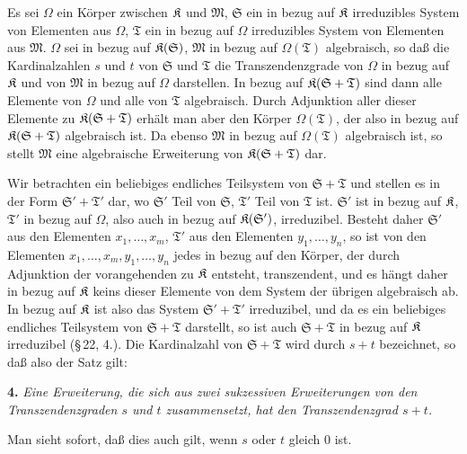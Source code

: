 Es sei \(\Omega\) ein Körper zwischen \(\mathfrak K\) und \(\mathfrak M\), \(\mathfrak S\) ein in bezug auf \(\mathfrak K\) irreduzibles System von Elementen aus \(\Omega\), \(\mathfrak T\) ein in bezug auf \(\Omega\) irreduzibles System von Elementen aus \(\mathfrak M\). \(\Omega\) sei in bezug auf \(\mathfrak K(\mathfrak S)\), \(\mathfrak M\) in bezug auf \(\Omega(\mathfrak T)\) algebraisch, so daß die Kardinalzahlen \(s\) und \(t\) von \(\mathfrak S\) und \(\mathfrak T\) die Transzendenzgrade von \(\Omega\) in bezug auf \(\mathfrak K\) und von \(\mathfrak M\) in bezug auf \(\Omega\) darstellen. In bezug auf \(\mathfrak K(\mathfrak S+\mathfrak T)\) sind dann alle Elemente von \(\Omega\) und alle von \(\mathfrak T\) algebraisch. Durch Adjunktion aller dieser Elemente zu \(\mathfrak K(\mathfrak S+\mathfrak T)\) erhält man aber den Körper \(\Omega(\mathfrak T)\), der also in bezug auf \(\mathfrak K(\mathfrak S+\mathfrak T)\) algebraisch ist. Da ebenso \(\mathfrak M\) in bezug auf \(\Omega(\mathfrak T)\) algebraisch ist, so stellt \(\mathfrak M\) eine algebraische Erweiterung von \(\mathfrak K(\mathfrak S+\mathfrak T)\) dar.

Wir betrachten ein beliebiges endliches Teilsystem von \(\mathfrak S+\mathfrak T\) und stellen es in der Form \(\mathfrak S'+\mathfrak T'\) dar, wo \(\mathfrak S'\) Teil von \(\mathfrak S\), \(\mathfrak T'\) Teil von \(\mathfrak T\) ist. \(\mathfrak S'\) ist in bezug auf \(\mathfrak K\), \(\mathfrak T'\) in bezug auf \(\Omega\), also auch in bezug auf \(\mathfrak K(\mathfrak S')\), irreduzibel. Besteht daher \(\mathfrak S'\) aus den Elementen \(x_1,\ldots,x_m\), \(\mathfrak T'\) aus den Elementen \(y_1,\ldots,y_n\), so ist von den Elementen \(x_1,\ldots,x_m,y_1,\ldots,y_n\) jedes in bezug auf den Körper, der durch Adjunktion der vorangehenden zu \(\mathfrak K\) entsteht, transzendent, und es hängt daher in bezug auf \(\mathfrak K\) keins dieser Elemente von dem System der übrigen algebraisch ab. In bezug auf \(\mathfrak K\) ist also das System \(\mathfrak S'+\mathfrak T'\) irreduzibel, und da es ein beliebiges endliches Teilsystem von \(\mathfrak S+\mathfrak T\) darstellt, so ist auch \(\mathfrak S+\mathfrak T\) in bezug auf \(\mathfrak K\) irreduzibel (\S\,22, 4.). Die Kardinalzahl von \(\mathfrak S+\mathfrak T\) wird durch \(s+t\) bezeichnet, so daß also der Satz gilt:

\textbf{4.} \emph{Eine Erweiterung, die sich aus zwei sukzessiven Erweiterungen von den Transzendenzgraden \(s\) und \(t\) zusammensetzt, hat den Transzendenzgrad \(s+t\).}

Man sieht sofort, daß dies auch gilt, wenn \(s\) oder \(t\) gleich 0 ist.


